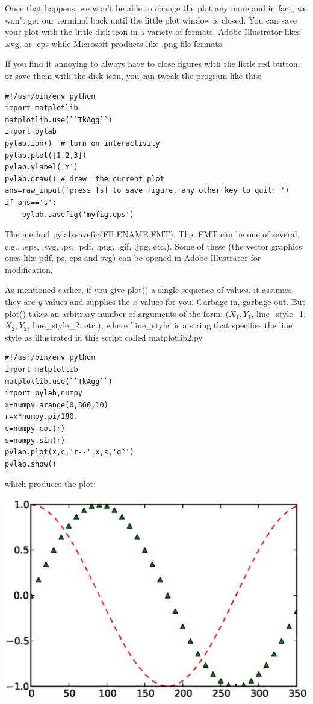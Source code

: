 \documentclass[11pt]{book}
\begin{document}
{{   \noindent Once that happens, we won't be able to change the plot any more and in fact, we won't get our terminal back until the little plot window is closed.   You can save your plot with the little disk icon in a variety of formats.  Adobe Illustrator likes .svg, or .eps while Microsoft products like .png file formats.

If you find it annoying to always have to close figures with the little red button, or save them with the disk icon, you can tweak the program like this:

{ \color{blue}\begin{verbatim}
#!/usr/bin/env python
import matplotlib
matplotlib.use(``TkAgg``)
import pylab
pylab.ion()  # turn on interactivity
pylab.plot([1,2,3])
pylab.ylabel('Y')
pylab.draw() # draw  the current plot
ans=raw_input('press [s] to save figure, any other key to quit: ')
if ans=='s':
    pylab.savefig('myfig.eps')
\end{verbatim}}

\noindent The method {\color{blue}pylab.savefig(FILENAME.FMT)}.  The .FMT can be one of several, e.g., .eps, .svg, .ps, .pdf, .png, .gif, .jpg, etc.).   Some of these (the vector graphics ones like pdf,  ps, eps and svg) can be opened in Adobe Illustrator for modification.


As mentioned earlier, if  you give {\color{blue}plot()} a single sequence of values, it assumes they are $y$ values and supplies the $x$ values for you.  Garbage in, garbage out.  But
 {\color{blue}plot()} takes an arbitrary number of arguments of the form: ($X_1, Y_1$, line\_style\_1, $X_2, Y_2$, line\_style\_2,  etc.),
 where 'line\_style' is a string that specifies the line style as illustrated in this script called {\color{blue}matplotlib2.py}


{ \color{blue} \begin{verbatim}
#!/usr/bin/env python
import matplotlib
matplotlib.use(``TkAgg``)
import pylab,numpy
x=numpy.arange(0,360,10)
r=x*numpy.pi/180.
c=numpy.cos(r)
s=numpy.sin(r)
pylab.plot(x,c,'r--',x,s,'g^')
pylab.show()
\end{verbatim}}

\noindent which produces the plot:

\includegraphics[width=15cm]{EPSfiles/matplotlib2.eps}

}}
\end{document}
